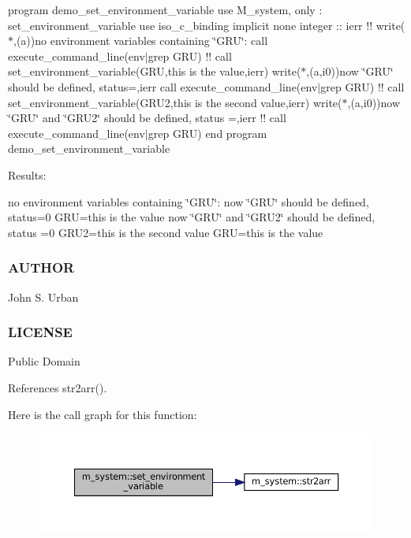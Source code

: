 program demo\+\_\+set\+\_\+environment\+\_\+variable use M\+\_\+system, only \+: set\+\_\+environment\+\_\+variable use iso\+\_\+c\+\_\+binding implicit none integer \+:\+: ierr !! write($\ast$,\textquotesingle{}(a)\textquotesingle{})\textquotesingle{}no environment variables containing \char`\"{}\+G\+R\+U\char`\"{}\+:\textquotesingle{} call execute\+\_\+command\+\_\+line(\textquotesingle{}env$\vert$grep G\+RU\textquotesingle{}) !! call set\+\_\+environment\+\_\+variable(\textquotesingle{}G\+RU\textquotesingle{},\textquotesingle{}this is the value\textquotesingle{},ierr) write($\ast$,\textquotesingle{}(a,i0)\textquotesingle{})\textquotesingle{}now \char`\"{}\+G\+R\+U\char`\"{} should be defined, status=\textquotesingle{},ierr call execute\+\_\+command\+\_\+line(\textquotesingle{}env$\vert$grep G\+RU\textquotesingle{}) !! call set\+\_\+environment\+\_\+variable(\textquotesingle{}G\+R\+U2\textquotesingle{},\textquotesingle{}this is the second value\textquotesingle{},ierr) write($\ast$,\textquotesingle{}(a,i0)\textquotesingle{})\textquotesingle{}now \char`\"{}\+G\+R\+U\char`\"{} and \char`\"{}\+G\+R\+U2\char`\"{} should be defined, status =\textquotesingle{},ierr !! call execute\+\_\+command\+\_\+line(\textquotesingle{}env$\vert$grep G\+RU\textquotesingle{}) end program demo\+\_\+set\+\_\+environment\+\_\+variable

Results\+:

no environment variables containing \char`\"{}\+G\+R\+U\char`\"{}\+: now \char`\"{}\+G\+R\+U\char`\"{} should be defined, status=0 G\+RU=this is the value now \char`\"{}\+G\+R\+U\char`\"{} and \char`\"{}\+G\+R\+U2\char`\"{} should be defined, status =0 G\+R\+U2=this is the second value G\+RU=this is the value \subsubsection*{A\+U\+T\+H\+OR}

John S. Urban \subsubsection*{L\+I\+C\+E\+N\+SE}

Public Domain 

References str2arr().

Here is the call graph for this function\+:
\nopagebreak
\begin{figure}[H]
\begin{center}
\leavevmode
\includegraphics[width=350pt]{namespacem__system_ad813765403a5d9d6fb7a2edcb669fe4b_cgraph}
\end{center}
\end{figure}
\mbox{\label{namespacem__system_af7e778ffc24aa7bc00b842a8e673aeaa}} 
